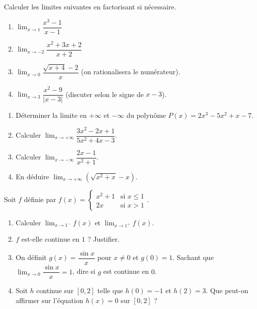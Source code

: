 \documentclass[11pt]{article}
\begin{document}
\begin{exercice}
Calculer les limites suivantes en factorisant si nécessaire.
\begin{enumerate}
    \item $\lim_{x \to 1} \dfrac{x^3 - 1}{x - 1}$
    \item $\lim_{x \to -2} \dfrac{x^2 + 3x + 2}{x + 2}$
    \item $\lim_{x \to 0} \dfrac{\sqrt{x+4} - 2}{x}$ (on rationalisera le numérateur).
    \item $\lim_{x \to 3} \dfrac{x^2 - 9}{|x-3|}$ (discuter selon le signe de $x-3$).
\end{enumerate}
\end{exercice}

\begin{exercice}
\begin{enumerate}
    \item Déterminer la limite en $+\infty$ et $-\infty$ du polynôme $P(x) = 2x^3 - 5x^2 + x - 7$.
    \item Calculer $\lim_{x \to +\infty} \dfrac{3x^2 - 2x + 1}{5x^2 + 4x - 3}$.
    \item Calculer $\lim_{x \to -\infty} \dfrac{2x - 1}{x^2 + 1}$.
    \item En déduire $\lim_{x \to +\infty} \left( \sqrt{x^2+x} - x \right)$.
\end{enumerate}
\end{exercice}

\begin{exercice}
Soit $f$ définie par $f(x) = \begin{cases} x^2 + 1 & \text{si } x \leq 1 \\ 2x & \text{si } x > 1 \end{cases}$.
\begin{enumerate}
    \item Calculer $\lim_{x \to 1^-} f(x)$ et $\lim_{x \to 1^+} f(x)$.
    \item $f$ est-elle continue en $1$ ? Justifier.
    \item On définit $g(x) = \dfrac{\sin x}{x}$ pour $x \neq 0$ et $g(0) = 1$. Sachant que $\lim_{x \to 0} \dfrac{\sin x}{x} = 1$, dire si $g$ est continue en $0$.
    \item Soit $h$ continue sur $[0, 2]$ telle que $h(0) = -1$ et $h(2) = 3$. Que peut-on affirmer sur l'équation $h(x) = 0$ sur $[0, 2]$ ?
\end{enumerate}
\end{exercice}
\end{document}
